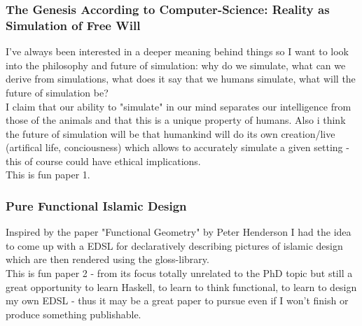 \subsubsection{The Genesis According to Computer-Science: Reality as Simulation of Free Will}
I've always been interested in a deeper meaning behind things so I want to look into the philosophy and future of simulation: why do we simulate, what can we derive from simulations, what does it say that we humans simulate, what will the future of simulation be? \\
I claim that our ability to "simulate" in our mind separates our intelligence from those of the animals and that this is a unique property of humans. Also i think the future of simulation will be that humankind will do its own creation/live (artifical life, conciousness) which allows to accurately simulate a given setting - this of course could have ethical implications. \\
This is fun paper 1.

\subsubsection{Pure Functional Islamic Design}
Inspired by the paper "Functional Geometry" by Peter Henderson I had the idea to come up with a  EDSL for declaratively describing pictures of islamic design which are then rendered using the gloss-library. \\
This is fun paper 2 - from its focus totally unrelated to the PhD topic but still a great opportunity to learn Haskell, to learn to think functional, to learn to design my own EDSL - thus it may be a great paper to pursue even if I won't finish or produce something publishable.